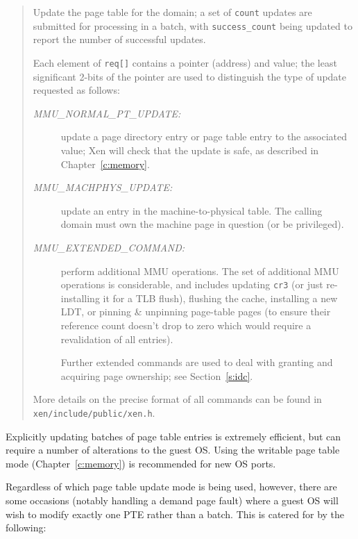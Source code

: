 \begin{quote} 

Update the page table for the domain; a set of {\tt count} updates are
submitted for processing in a batch, with {\tt success\_count} being 
updated to report the number of successful updates.  

Each element of {\tt req[]} contains a pointer (address) and value; 
the least significant 2-bits of the pointer are used to distinguish 
the type of update requested as follows:
\begin{description} 

\item[\it MMU\_NORMAL\_PT\_UPDATE:] update a page directory entry or
page table entry to the associated value; Xen will check that the
update is safe, as described in Chapter~\ref{c:memory}.

\item[\it MMU\_MACHPHYS\_UPDATE:] update an entry in the
  machine-to-physical table. The calling domain must own the machine
  page in question (or be privileged).

\item[\it MMU\_EXTENDED\_COMMAND:] perform additional MMU operations.
The set of additional MMU operations is considerable, and includes
updating {\tt cr3} (or just re-installing it for a TLB flush),
flushing the cache, installing a new LDT, or pinning \& unpinning
page-table pages (to ensure their reference count doesn't drop to zero
which would require a revalidation of all entries).

Further extended commands are used to deal with granting and 
acquiring page ownership; see Section~\ref{s:idc}. 


\end{description}

More details on the precise format of all commands can be 
found in {\tt xen/include/public/xen.h}. 


\end{quote}

Explicitly updating batches of page table entries is extremely
efficient, but can require a number of alterations to the guest
OS. Using the writable page table mode (Chapter~\ref{c:memory}) is
recommended for new OS ports.

Regardless of which page table update mode is being used, however,
there are some occasions (notably handling a demand page fault) where
a guest OS will wish to modify exactly one PTE rather than a
batch. This is catered for by the following:

